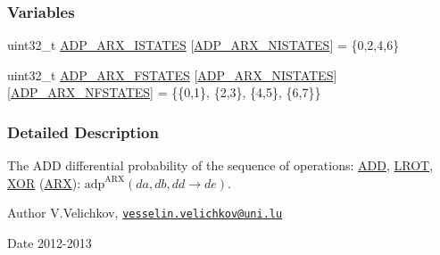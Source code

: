 \subsubsection*{\-Variables}
\begin{DoxyCompactItemize}
\item 
uint32\-\_\-t \hyperlink{adp-arx_8cc_a94f941841e2bc961bc9abd1c7e0b8513}{\-A\-D\-P\-\_\-\-A\-R\-X\-\_\-\-I\-S\-T\-A\-T\-E\-S} \mbox{[}\hyperlink{adp-arx_8hh_af9236f8d08a54b97ed2199271de979f6}{\-A\-D\-P\-\_\-\-A\-R\-X\-\_\-\-N\-I\-S\-T\-A\-T\-E\-S}\mbox{]} = \{0,2,4,6\}
\item 
uint32\-\_\-t \hyperlink{adp-arx_8cc_af70040b1b46c82f1fbe37b5bab89d7db}{\-A\-D\-P\-\_\-\-A\-R\-X\-\_\-\-F\-S\-T\-A\-T\-E\-S} \mbox{[}\hyperlink{adp-arx_8hh_af9236f8d08a54b97ed2199271de979f6}{\-A\-D\-P\-\_\-\-A\-R\-X\-\_\-\-N\-I\-S\-T\-A\-T\-E\-S}\mbox{]}\mbox{[}\hyperlink{adp-arx_8hh_a233a0b6f32ce3bbaac71e99d06e26e1d}{\-A\-D\-P\-\_\-\-A\-R\-X\-\_\-\-N\-F\-S\-T\-A\-T\-E\-S}\mbox{]} = \{\{0,1\}, \{2,3\}, \{4,5\}, \{6,7\}\}
\end{DoxyCompactItemize}


\subsubsection{\-Detailed \-Description}
\-The \-A\-D\-D differential probability of the sequence of operations\-: \hyperlink{common_8hh_af3b709fb668cf93ca09e2a46a2a031a8}{\-A\-D\-D}, \hyperlink{common_8hh_abe2030c44a97657e1b1dbe9b0e093a7b}{\-L\-R\-O\-T}, \hyperlink{common_8hh_a6de9ec3b3b57377b69a82239ea52ec6e}{\-X\-O\-R} (\hyperlink{common_8hh_a7d3da57c58af293c7c57e4f1b551849d}{\-A\-R\-X})\-: $\mathrm{adp}^{\mathrm{ARX}}(da,db,dd \rightarrow de)$. \begin{DoxyAuthor}{\-Author}
\-V.\-Velichkov, \href{mailto:vesselin.velichkov@uni.lu}{\tt vesselin.\-velichkov@uni.\-lu} 
\end{DoxyAuthor}
\begin{DoxyDate}{\-Date}
2012-\/2013 
\end{DoxyDate}


